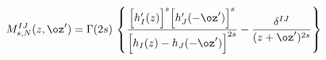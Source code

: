 \begin{equation}
M_{s,N}^{IJ}(z,\oz')=\Gamma(2s)\,\left\{
\frac{\Bigl[h_I'(z)\Bigr]^s\Bigl[h_J'(-\oz')\Bigr]^s}
{\Bigl[h_I(z)-h_J(-\oz')\Bigr]^{2s}}
-\frac{\delta^{IJ}}{(z+\oz')^{2s}}
\right\}
\label{Mmaps}
\end{equation}

